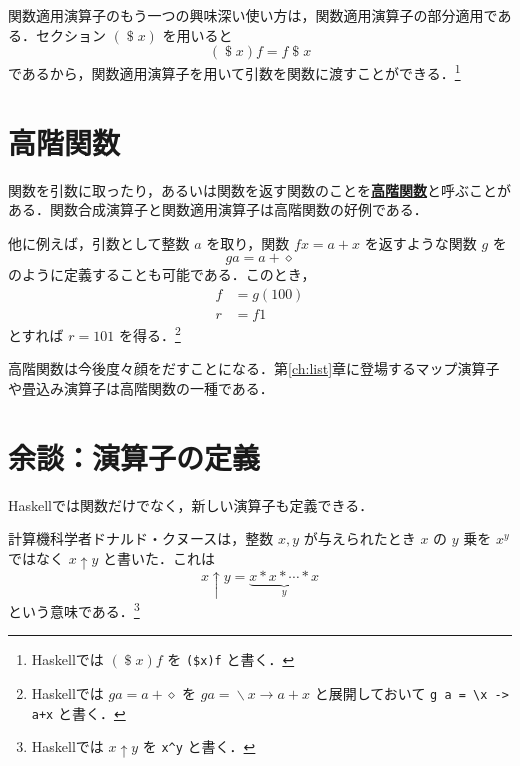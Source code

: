 \documentclass[a4paper,twocolumn]{jsbook}
\newcommand{\programminglanguage}[1]{\textsf{#1}}
\newcommand{\haskell}{\programminglanguage{Haskell}}
\newcommand{\keyword}[1]{{\underline{\textbf{#1}}}}
\newcommand{\code}[1]{\texttt{#1}}
\newcommand{\mAnonParam}{\diamond}
\DeclareMathOperator{\mApply}{\$}
\DeclareMathOperator{\mLambda}{\backslash}
\DeclareMathOperator{\mLambdaArrow}{\rightarrow}
\newcommand{\mLambdaExp}[2]{\mLambda{#1}\mLambdaArrow{#2}}
\begin{document}
関数適用演算子のもう一つの興味深い使い方は，関数適用演算子の部分適用である．セクション $(\mApply x)$ を用いると
\begin{equation}
(\mApply x)f=f\mApply x
\end{equation}
であるから，関数適用演算子を用いて引数を関数に渡すことができる．\footnote{\haskell では $(\mApply x)f$ を \code{(\$x)f} と書く．}

\section{高階関数}

関数を引数に取ったり，あるいは関数を返す関数のことを\keyword{高階関数}と呼ぶことがある．関数合成演算子と関数適用演算子は高階関数の好例である．

他に例えば，引数として整数 $a$ を取り，関数 $fx=a+x$ を返すような関数 $g$ を
\begin{equation}
ga=a+\mAnonParam
\end{equation}
のように定義することも可能である．このとき，
\begin{align}
f&=g(100)\\
r&=f1
\end{align}
とすれば $r=101$ を得る．\footnote{\haskell では $ga=a+\mAnonParam$ を $ga=\mLambdaExp{x}{a+x}$ と展開しておいて \code{g a = \textbackslash x -> a+x} と書く．}

高階関数は今後度々顔をだすことになる．第\ref{ch:list}章に登場するマップ演算子や畳込み演算子は高階関数の一種である．

\section{余談：演算子の定義}

\haskell では関数だけでなく，新しい演算子も定義できる．

計算機科学者ドナルド・クヌースは，整数 $x,y$ が与えられたとき $x$ の $y$ 乗を $x^y$ ではなく $x\uparrow y$ と書いた．これは
\begin{equation}
x\uparrow y=\underbrace{x*x*\dotsb*x}_{y}%
\end{equation}
という意味である．\footnote{\haskell では $x\uparrow y$ を \code{x\textasciicircum y} と書く．}
\end{document}
